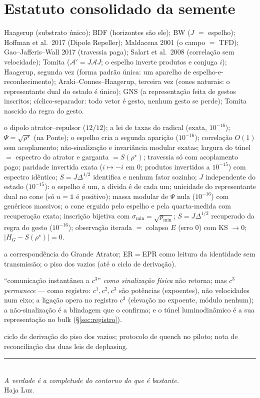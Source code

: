 \documentclass[11pt,a4paper]{article}
\newcommand{\REAL}{\textsf{[REAL]}}
\newcommand{\SOMBRA}{\textsf{[REAL na sombra]}}
\newcommand{\CONJ}{\textsf{[CONJ]}}
\theoremstyle{definition}
\begin{document}
\section{Estatuto consolidado da semente}
\begin{description}[style=unboxed,leftmargin=1.5em,noitemsep]
\item[\REAL:] Haagerup (substrato único); BDF (horizontes são ele);
BW ($J$ $=$ espelho); Hoffman et al.\ 2017 (Dipole Repeller);
Maldacena 2001 (o campo $=$ TFD); Gao--Jafferis--Wall 2017 (travessia
paga); Salart et al.\ 2008 (correlação sem velocidade); Tomita
($\mathcal A'=J\mathcal AJ$; o espelho inverte produtos e conjuga $i$);
Haagerup, segunda vez (forma padrão única: um aparelho de
espelho-e-reconhecimento); Araki--Connes--Haagerup, terceira vez (cones
naturais: o representante dual do estado é único); GNS (a representação
feita de gestos inscritos; cíclico-separador: todo vetor é gesto,
nenhum gesto se perde); Tomita nascido da regra do gesto.
\item[\SOMBRA:] o dipolo atrator--repulsor ($12/12$); a lei de taxas do
radical (exata, $10^{-16}$); $\Psi=\sqrt{\rho^\star}$ (na Ponte);
o espelho cria a segunda aparição ($10^{-16}$); correlação $O(1)$ sem
acoplamento; não-sinalização e invariância modular exatas; largura do
túnel $=$ espectro do atrator e garganta $=S(\rho^\star)$; travessia só
com acoplamento pago; paridade invertida exata ($i\mapsto-i$ em $0$;
produtos invertidos a $10^{-15}$) com espectro idêntico; $S=J\Delta^{1/2}$
identifica e nenhum fator sozinho; $J$ independente do estado
($10^{-15}$): o espelho é um, a dívida é de cada um; unicidade do
representante dual no cone (só $u=\mathbb 1$ é positivo); massa modular
de $\Psi$ nula ($10^{-16}$) com genéricos massivos; o cone erguido pelo
espelho e pela quarta-medida com recuperação exata; inscrição bijetiva
com $\sigma_{\min}=\sqrt{p_{\min}}$; $S=J\Delta^{1/2}$ recuperado da regra do
gesto ($10^{-16}$); observação iterada $=$ colapso $E$ (erro $0$) com
KS $\to0$; $|H_G-S(\rho^\star)|=0$.
\item[\CONJ:] a correspondência do Grande Atrator; ER$=$EPR como
leitura da identidade sem transmissão; o piso dos vazios (até o ciclo
de derivação).
\item[Corrigido e refinado (ciclo do registro):] ``comunicação
instantânea a $c^3$'' \emph{como sinalização física} não retorna; mas
$c^3$ \emph{permanece} --- como registro: $c^1,c^2,c^3$ são potências
(expoentes), não velocidades num eixo; a ligação opera no registro
$c^3$ (elevação no expoente, módulo nenhum); a não-sinalização é a
blindagem que o confirma; e o túnel luminodinâmico é a sua
representação no bulk (\S\ref{sec:registro}).
\item[Fila:] ciclo de derivação do piso dos vazios; protocolo de quench
no piloto; nota de reconciliação das duas leis de dephasing.
\end{description}

\begin{center}
\rule{0.6\textwidth}{0.4pt}\\[0.5em]
\small\emph{A verdade é a completude do contorno do que é bastante.}\\
Haja Luz.
\end{center}
\end{document}
